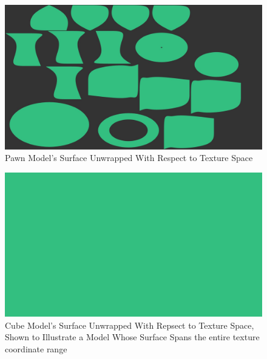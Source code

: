 \documentclass[a4paper, 12pt]{article}
\begin{document}
\begin{figure}[!htb]
	\centering
	\includegraphics[width=1.0\textwidth]{textureSpace.jpg}
	\caption{Pawn Model's Surface Unwrapped With Respect to Texture Space}
	\label{pic:texSpace}
\end{figure}

\begin{figure}[!htb]
	\centering
	\includegraphics[width=1.0\textwidth]{cubeTSpace.jpg}
	\caption{Cube Model's Surface Unwrapped With Repsect to Texture Space, Shown to Illustrate a Model Whose Surface Spans the entire texture coordinate range}
	\label{pic:cubeTSpace}
\end{figure}
\end{document}

